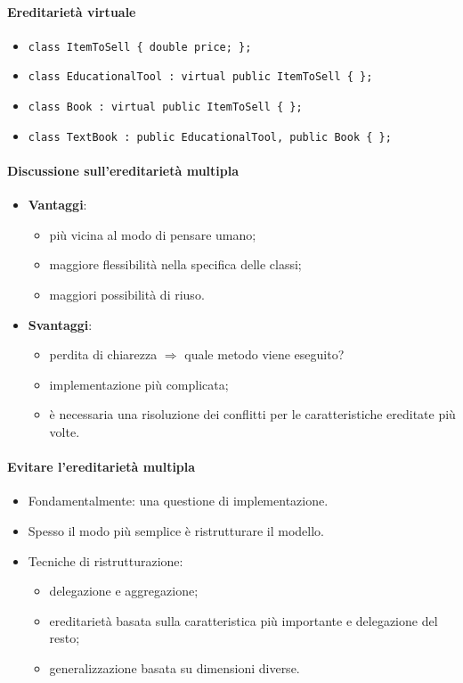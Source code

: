 \documentclass[a4paper,12pt]{article}
\begin{document}
\paragraph{Ereditarietà virtuale}
\begin{itemize}
  \item \texttt{class ItemToSell \{ double price; \};}
  \item \texttt{class EducationalTool : {\color{red}virtual} public ItemToSell \{ \};}
  \item \texttt{class Book : {\color{red}virtual} public ItemToSell \{ \};}
  \item \texttt{class TextBook : public EducationalTool, public Book \{ \};}
\end{itemize}
\paragraph{Discussione sull'ereditarietà multipla}
\begin{itemize}
  \item \textbf{Vantaggi}:
  \begin{itemize}
    \item più vicina al modo di pensare umano;
    \item maggiore flessibilità nella specifica delle classi;
    \item maggiori possibilità di riuso.
  \end{itemize}
  \item \textbf{Svantaggi}:
  \begin{itemize}
    \item perdita di chiarezza $\Rightarrow$ quale metodo viene eseguito?
    \item implementazione più complicata;
    \item è necessaria una risoluzione dei conflitti per le caratteristiche ereditate
          più volte.
  \end{itemize}
\end{itemize}
\paragraph{Evitare l'ereditarietà multipla}
\begin{itemize}
  \item Fondamentalmente: una questione di implementazione.
  \item Spesso il modo più semplice è ristrutturare il modello.
  \item Tecniche di ristrutturazione:
  \begin{itemize}
    \item delegazione e aggregazione;
    \item ereditarietà basata sulla caratteristica più importante e delegazione del
          resto;
    \item generalizzazione basata su dimensioni diverse.
  \end{itemize}
\end{itemize}
\end{document}
